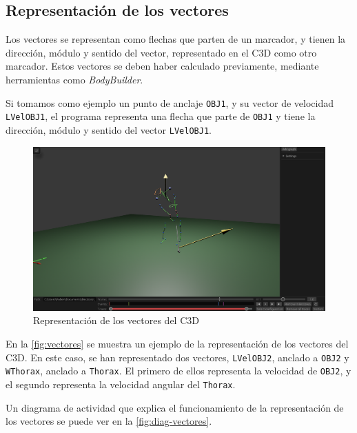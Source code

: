 \subsection{Representación de los vectores} \label{sec:representacion-vectores}

Los vectores se representan como flechas que parten de un marcador, y tienen la dirección, módulo y sentido del vector, representado en el \ac{C3D} como otro marcador. Estos vectores se deben haber calculado previamente, mediante herramientas como \textit{BodyBuilder}.

Si tomamos como ejemplo un punto de anclaje \texttt{OBJ1}, y su vector de velocidad \texttt{LVelOBJ1}, el programa representa una flecha que parte de \texttt{OBJ1} y tiene la dirección, módulo y sentido del vector \texttt{LVelOBJ1}.

\begin{figure}[H]
  \centering
  \includegraphics[width=\textwidth]{imagenes/vectores.png}
  \caption{Representación de los vectores del \ac{C3D}}
  \label{fig:vectores}
\end{figure}

En la \autoref{fig:vectores} se muestra un ejemplo de la representación de los vectores del \ac{C3D}. En este caso, se han representado dos vectores, \texttt{LVelOBJ2}, anclado a \texttt{OBJ2} y \texttt{WThorax}, anclado a \texttt{Thorax}. El primero de ellos representa la velocidad de \texttt{OBJ2}, y el segundo representa la velocidad angular del \texttt{Thorax}.

Un diagrama de actividad que explica el funcionamiento de la representación de los vectores se puede ver en la \autoref{fig:diag-vectores}.

